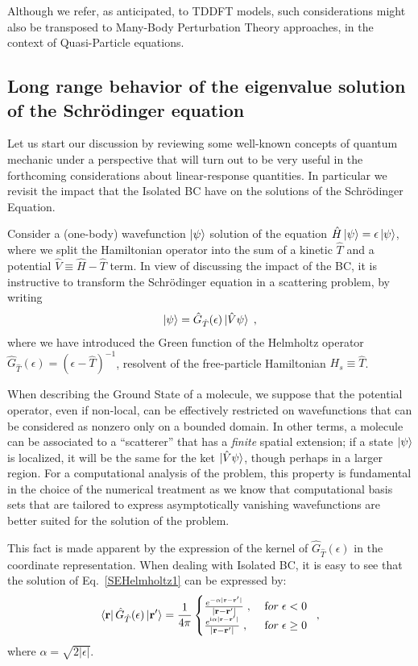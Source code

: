 \documentclass[reprint,aps,prb]{revtex4-1}
\renewcommand{\r}{{\bf r}}
\newcommand{\eps}{\epsilon}
\newcommand{\ii}{\mathrm{i}}
\newcommand{\be}{\begin{equation}}
\newcommand{\ee}{\end{equation}}
\newcommand{\lb}{\label}
\newcommand{\op}[1]{\hat {#1}}
\newcommand{\GH}{\op G_{\op T}}
\begin{document}
Although we refer, as anticipated, to TDDFT models, such considerations might also be transposed to Many-Body Perturbation Theory
approaches, in the context of Quasi-Particle equations.

\subsection{Long range behavior of the eigenvalue solution of the Schr\"odinger equation}
\label{SEopenSystem}

Let us start our discussion by reviewing some well-known concepts of quantum mechanic under a perspective that will turn out to be very useful
in the forthcoming considerations about linear-response quantities. In particular we revisit the impact that the Isolated BC have on the solutions
of the Schr\"odinger Equation.

Consider a (one-body) wavefunction $\ket{\psi}$ solution of the equation
$\op H\ket{\psi}=\eps\ket{\psi}$, where we split the Hamiltonian operator into the sum of
a kinetic $\op T$ and a potential $\op V \equiv \op H - \op T$ term.
In view of discussing the impact of the BC, it is instructive to transform
the Schr\"odinger equation in a scattering problem, by writing
\be\lb{SEHelmholtz1}
\ket{\psi} = \GH(\eps)\ket{\op V\psi}\;,
\ee
where we have introduced the Green function of the Helmholtz operator $\GH(\eps) = (\eps-\op T)^{-1}$,
resolvent of the free-particle Hamiltonian $H_s \equiv \op T$.

When describing the Ground State of a molecule, we suppose that the potential operator, even if non-local,
can be effectively restricted on wavefunctions that can be considered as nonzero only on a
bounded domain. In other terms, a molecule can be associated to a ``scatterer'' that has a \emph{finite}
spatial extension; if a state $\ket{\psi}$ is localized, it will be the same for the ket $\ket{\op V \psi}$, though
perhaps in a larger region.
For a computational analysis of the problem, this property is fundamental in the choice of the numerical treatment as we know that
computational basis sets
that are tailored to express asymptotically vanishing wavefunctions are better suited for the solution of the problem.

This fact is made apparent by the expression of
the kernel of $\GH(\eps)$ in the coordinate representation.
When dealing with Isolated BC, it is easy to see that the solution of Eq.~\eqref{SEHelmholtz1}
can be expressed by:
\be\lb{HelmholtzKernelDef1}
\bra{\r} \GH(\eps) \ket{\r'} = \frac{1}{4\pi} \begin{cases}
\frac{e^{-\alpha|\r - \r' |}}{|\r- \r' |} \;,\; & {\textrm for}\; \eps  < 0\; \\
\frac{e^{\ii \alpha |\r-\r' |}}{|\r-\r' |} \;, & {\textrm for} \; \eps \geq 0
\end{cases} \;,
\ee
where $\alpha = \sqrt{2|\eps|}$.
\end{document}

